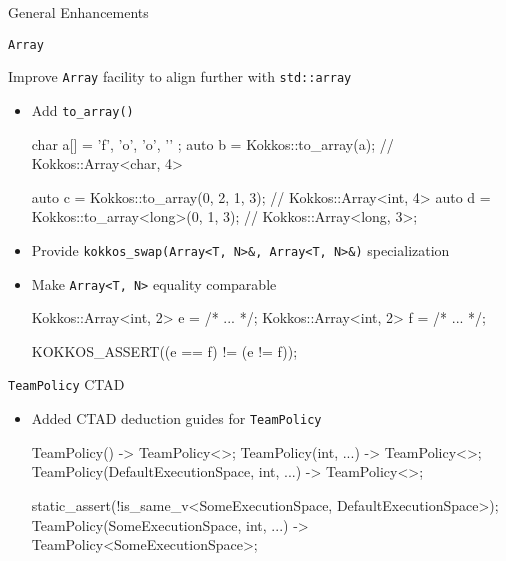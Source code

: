 
\begin{frame}[fragile]

  {\Huge General Enhancements}

  \vspace{10pt}

\end{frame}

\begin{frame}[fragile]{\texttt{Array}}

Improve \texttt{Array} facility to align further with \texttt{std::array}
\begin{itemize}
\item Add \texttt{to\_array()}
\begin{code}
char a[] = { 'f', 'o', 'o', '\0' };
auto b = Kokkos::to_array(a);                // Kokkos::Array<char, 4>

auto c = Kokkos::to_array({0, 2, 1, 3});     // Kokkos::Array<int, 4>
auto d = Kokkos::to_array<long>({0, 1, 3});  // Kokkos::Array<long, 3>;
\end{code}
\item Provide \texttt{kokkos\_swap(Array<T, N>\&, Array<T, N>\&)} specialization
\item Make \texttt{Array<T, N>} equality comparable
\begin{code}
Kokkos::Array<int, 2> e = /* ... */;
Kokkos::Array<int, 2> f = /* ... */;

KOKKOS_ASSERT((e == f) != (e != f));
\end{code}
\end{itemize}

\end{frame}


\begin{frame}[fragile]{\texttt{TeamPolicy} CTAD}
\begin{itemize}
\item Added CTAD deduction guides for \texttt{TeamPolicy}
\begin{code}
TeamPolicy()                                -> TeamPolicy<>;
TeamPolicy(int, ...)                        -> TeamPolicy<>;
TeamPolicy(DefaultExecutionSpace, int, ...) -> TeamPolicy<>;

static_assert(!is_same_v<SomeExecutionSpace, DefaultExecutionSpace>);
TeamPolicy(SomeExecutionSpace, int, ...)    -> TeamPolicy<SomeExecutionSpace>;

\end{code}
\end{itemize}

\end{frame}

